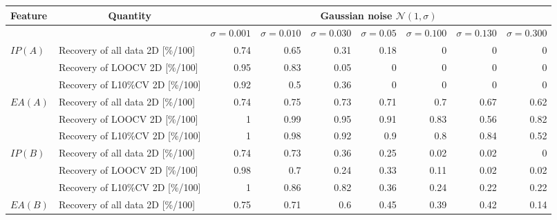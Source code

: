 \documentclass[11pt,oneside,czech,american]{book} %
\theoremstyle{definition} %
\theoremstyle{definition}
\begin{document}
\begin{table}[H]
	\centering
	\scriptsize
	\begin{tabular}{llrrrrrrr} 
	\hline
	Feature                  & \multicolumn{1}{c}{Quantity} & \multicolumn{7}{c}{ Gaussian noise $\mathcal{N}(1,\sigma)$}                                                                \\ 
	\hline
	&                              & $\sigma = 0.001$ & $\sigma = 0.010$ & $\sigma = 0.030$ & $\sigma = 0.05$ & $\sigma = 0.100$ & $\sigma = 0.130$ & $\sigma = 0.300$  \\ 
	\hline
	\multirow{3}{*}{$IP(A)$}   & Recovery of all data 2D [\%/100] & 0.74          & 0.65          & 0.31          & 0.18         & 0             & 0             & 0              \\
	& Recovery of LOOCV 2D [\%/100]    & 0.95          & 0.83          & 0.05          & 0            & 0             & 0             & 0              \\
	& Recovery of L10\%CV 2D [\%/100]  & 0.92          & 0.5           & 0.36          & 0            & 0             & 0             & 0              \\ 
	\hline
	\multirow{3}{*}{$EA(A)$}   & Recovery of all data 2D [\%/100] & 0.74          & 0.75          & 0.73          & 0.71         & 0.7           & 0.67          & 0.62           \\
	& Recovery of LOOCV 2D [\%/100]    & 1             & 0.99          & 0.95          & 0.91         & 0.83          & 0.56          & 0.82           \\
	& Recovery of L10\%CV 2D [\%/100]  & 1             & 0.98          & 0.92          & 0.9          & 0.8           & 0.84          & 0.52           \\ 
	\hline
	\multirow{3}{*}{$IP(B)$}   & Recovery of all data 2D [\%/100] & 0.74          & 0.73          & 0.36          & 0.25         & 0.02          & 0.02          & 0              \\
	& Recovery of LOOCV 2D [\%/100]    & 0.98          & 0.7           & 0.24          & 0.33         & 0.11          & 0.02          & 0.02           \\
	& Recovery of L10\%CV 2D [\%/100]  & 1             & 0.86          & 0.82          & 0.36         & 0.24          & 0.22          & 0.22           \\ 
	\hline
	\multirow{3}{*}{$EA(B)$}   & Recovery of all data 2D [\%/100] & 0.75          & 0.71          & 0.6           & 0.45         & 0.39          & 0.42          & 0.14           \\

\end{tabular}
\end{table}
\end{document}
